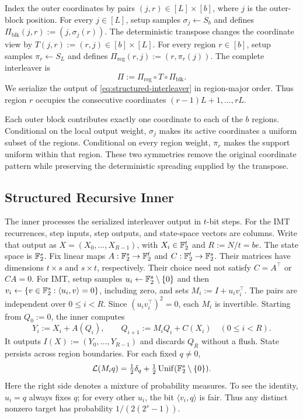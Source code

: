 Index the outer coordinates by pairs $(j,r)\in[L]\times[b]$, where $j$ is
the outer-block position. For every $j\in[L]$, setup samples
$\sigma_j\gets S_b$ and defines
$\Pi_{\mathrm{blk}}(j,r):=(j,\sigma_j(r))$.
The deterministic transpose changes the coordinate view by
$T(j,r):=(r,j)\in[b]\times[L]$.
For every region $r\in[b]$, setup samples $\pi_r\gets S_L$ and defines
$\Pi_{\mathrm{reg}}(r,j):=(r,\pi_r(j))$.
The complete interleaver is
\begin{equation}
  \Pi
  :=
  \Pi_{\mathrm{reg}}\circ T\circ\Pi_{\mathrm{blk}}.
  \label{eq:structured-interleaver}
\end{equation}
We serialize the output of \eqref{eq:structured-interleaver} in region-major
order. Thus region $r$ occupies the consecutive coordinates
$(r-1)L+1,\ldots,rL$.

Each outer block contributes exactly one coordinate to each of the $b$
regions. Conditional on the local output weight, $\sigma_j$ makes its active
coordinates a uniform subset of the regions. Conditional on every region
weight, $\pi_r$ makes the support uniform within that region. These two
symmetries remove the original coordinate pattern while preserving the
deterministic spreading supplied by the transpose.

\subsection{Structured Recursive Inner}

The inner processes the serialized interleaver output in $t$-bit steps.
For the IMT recurrences, step inputs, step outputs, and state-space vectors
are columns.
Write that output as $X=(X_0,\ldots,X_{R-1})$, with $X_i\in\mathbb F_2^t$ and
$R:=N/t=be$. The state space is $\mathbb F_2^s$.
Fix linear maps $A:\mathbb F_2^s\to\mathbb F_2^t$ and $C:\mathbb F_2^t\to\mathbb F_2^s$.
Their matrices have dimensions $t\times s$ and $s\times t$, respectively.
Their choice need not satisfy $C=A^\top$ or $CA=0$.
For IMT, setup samples $u_i\gets\mathbb F_2^s\setminus\{0\}$ and then
$v_i\gets\{v\in\mathbb F_2^s:\langle u_i,v\rangle=0\}$, including zero, and sets
$M_i:=I+u_iv_i^\top$. The pairs are independent over $0\le i<R$.
Since $(u_iv_i^\top)^2=0$, each $M_i$ is invertible.
Starting from $Q_0:=0$, the inner computes
\begin{equation}
  Y_i:=X_i+A(Q_i),
  \qquad
  Q_{i+1}:=M_iQ_i+C(X_i)
  \quad(0\le i<R).
  \label{eq:structured-inner}
\end{equation}
It outputs $I(X):=(Y_0,\ldots,Y_{R-1})$ and discards $Q_R$ without a flush.
State persists across region boundaries. For each fixed $q\ne0$,
\[
  \mathcal L(M_iq)=
  \tfrac12\delta_q+\tfrac12\operatorname{Unif}(\mathbb F_2^s\setminus\{0\}).
\]
Here the right side denotes a mixture of probability measures. To see the
identity, $u_i=q$ always fixes $q$; for every other $u_i$, the bit
$\langle v_i,q\rangle$ is fair. Thus any distinct nonzero target has
probability $1/(2(2^s-1))$.

